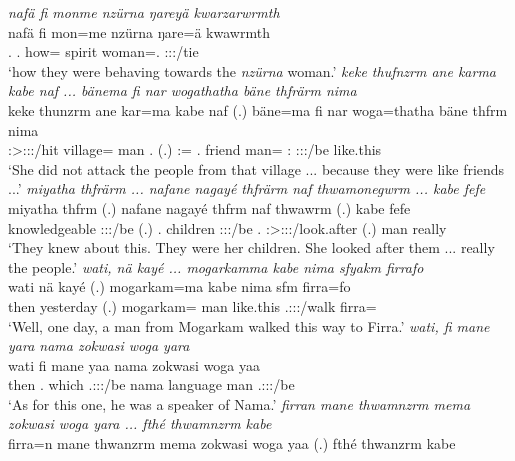 \begin{exe}
	\emph{nafä fi monme nzürna ŋareyä kwarzarwrmth}\\
	\gll nafä fi mon=me nzürna ŋare=ä kwawrmth\\
	\Tpl.{\Assoc} \Third.{\Abs} how={\Ins} spirit woman=\Assoc.{\Pl} \Stpl:\Sbj:\Pst:\Dur/tie\\
	\trans `how they were behaving towards the \emph{nzürna} woman.'
	\emph{keke thufnzrm ane karma kabe naf ... bänema fi nar wogathatha bäne thfrärm nima}\\
	\gll keke thunzrm ane kar=ma kabe naf (.) bäne=ma fi nar woga=thatha bäne thfrm nima\\
	{\Neg} \Stsg:\Sbj>\Stpl:\Obj:\Pst:\Dur/hit {\Dem} village={\Char} man \Tsg.{\Erg} (.) \Dem:\Med={\Char} \Third.{\Abs} friend man=\Simil{} \Dem:\Med{} \Stpl:\Sbj:\Pst:\Dur/be {like.this}\\
	\trans `She did not attack the people from that village ... because they were like friends ...'
	\emph{miyatha thfrärm ... nafane nagayé thfrärm naf thwamonegwrm ... kabe fefe}\\
	\gll miyatha thfrm (.) nafane nagayé thfrm naf thwawrm (.) kabe fefe\\
	knowledgeable \Stpl:\Sbj:\Pst:\Dur/be (.) \Tnsg.{\Poss} children \Stpl:\Sbj:\Pst:\Dur/be \Tsg.{\Erg} \Stsg:\Sbj>\Stpl:\Io:\Pst:\Dur/look.after (.) man really\\
	\trans `They knew about this. They were her children. She looked after them ... really the people.'
	\emph{wati, nä kayé ... mogarkamma kabe nima sfyakm firrafo}\\
	\gll wati nä kayé (.) mogarkam=ma kabe nima sfm firra=fo\\
	then {\Indf} yesterday (.) mogarkam={\Char} man {like.this} \Tsg.\Masc:\Sbj:\Pst:\Dur/walk firra={\All}\\
	\trans `Well, one day, a man from Mogarkam walked this way to Firra.'
	\emph{wati, fi mane yara nama zokwasi woga yara}\\
	\gll wati fi mane yaa nama zokwasi woga yaa\\
	then \Third.{\Abs} which \Tsg.\Masc:\Sbj:\Pst:\Ipfv/be nama language man \Tsg.\Masc:\Sbj:\Pst:\Ipfv/be\\
	\trans `As for this one, he was a speaker of Nama.'
	\emph{firran mane thwamnzrm mema zokwasi woga yara ... fthé thwamnzrm kabe}\\
	\gll firra=n mane thwanzrm mema zokwasi woga yaa (.) fthé thwanzrm kabe\\

\end{exe}
